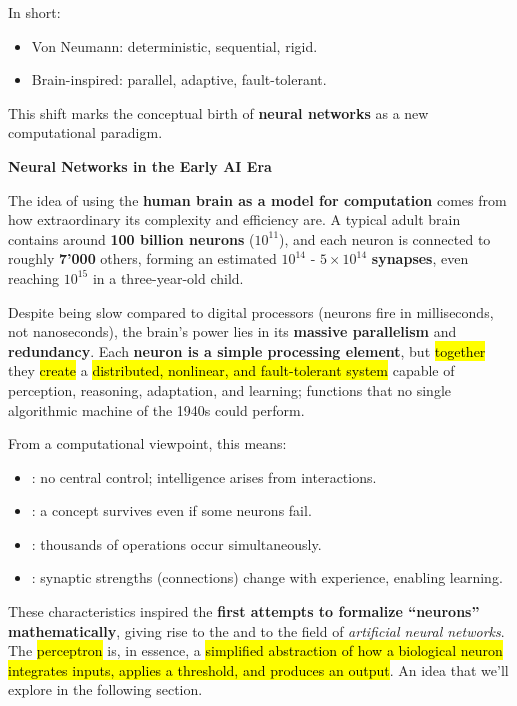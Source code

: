 \newpage

\noindent
In short:
\begin{itemize}
    \item Von Neumann: deterministic, sequential, rigid.
    \item Brain-inspired: parallel, adaptive, fault-tolerant.
\end{itemize}
This shift marks the conceptual birth of \textbf{neural networks} as a new computational paradigm.

\highspace
\begin{flushleft}
    \textcolor{Green3}{ \textbf{Neural Networks in the Early AI Era}}
\end{flushleft}
The idea of using the \textbf{human brain as a model for computation} comes from how extraordinary its complexity and efficiency are. A typical adult brain contains around \textbf{100 billion neurons} ($10^{11}$), and each neuron is connected to roughly \textbf{7'000} others, forming an estimated $10^{14}$ - $5 \times 10^{14}$ \textbf{synapses}, even reaching $10^{15}$ in a three-year-old child.

\highspace
Despite being slow compared to digital processors (neurons fire in milliseconds, not nanoseconds), the brain's power lies in its \textbf{massive parallelism} and \textbf{redundancy}. Each \textbf{neuron is a simple processing element}, but \hl{together} they \hl{create} a \hl{distributed, nonlinear, and fault-tolerant system} capable of perception, reasoning, adaptation, and learning; functions that no single algorithmic machine of the 1940s could perform.

\highspace
From a computational viewpoint, this means:
\begin{itemize}
    \item {}: no central control; intelligence arises from interactions.
    \item {}: a concept survives even if some neurons fail.
    \item {}: thousands of operations occur simultaneously.
    \item {}: synaptic strengths (connections) change with experience, enabling learning.
\end{itemize}
These characteristics inspired the \textbf{first attempts to formalize ``neurons'' mathematically}, giving rise to the  and to the field of \emph{artificial neural networks}. The \hl{perceptron} is, in essence, a \hl{simplified abstraction of how a biological neuron integrates inputs, applies a threshold, and produces an output}. An idea that we'll explore in the following section.

